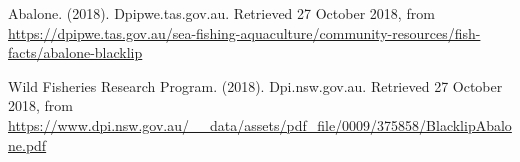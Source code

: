 \documentclass[9pt,twocolumn]{article}
\begin{document}
	\begin{thebibliography}{9}
		Abalone. (2018). Dpipwe.tas.gov.au. Retrieved 27 October 2018, from \url{https://dpipwe.tas.gov.au/sea-fishing-aquaculture/community-resources/fish-facts/abalone-blacklip}
		
		Wild Fisheries Research Program. (2018). Dpi.nsw.gov.au. Retrieved 27 October 2018, from		\url{https://www.dpi.nsw.gov.au/__data/assets/pdf_file/0009/375858/BlacklipAbalone.pdf}
	\end{thebibliography}
\end{document}
